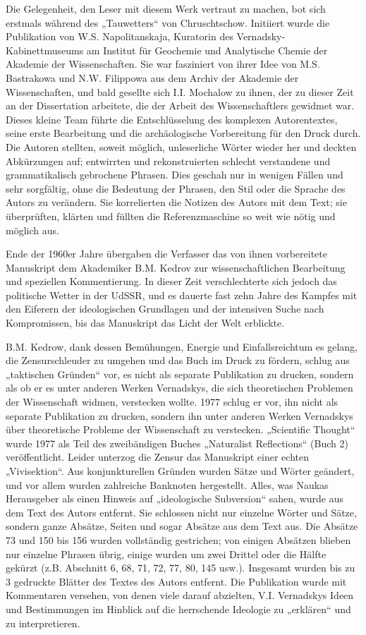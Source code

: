 \documentclass[11pt,a4paper]{article}
\begin{document}
Die Gelegenheit, den Leser mit diesem Werk vertraut zu machen, bot sich
erstmals während des „Tauwetters“ von Chruschtschow. Initiiert wurde die
Publikation von W.S. Napolitanskaja, Kuratorin des Vernadsky-Kabinettmuseums
am Institut für Geochemie und Analytische Chemie der Akademie der
Wissenschaften. Sie war fasziniert von ihrer Idee von M.S. Bastrakowa und
N.W. Filippowa aus dem Archiv der Akademie der Wissenschaften, und bald
gesellte sich I.I. Mochalow zu ihnen, der zu dieser Zeit an der Dissertation
arbeitete, die der Arbeit des Wissenschaftlers gewidmet war. Dieses kleine
Team führte die Entschlüsselung des komplexen Autorentextes, seine erste
Bearbeitung und die archäologische Vorbereitung für den Druck durch. Die
Autoren stellten, soweit möglich, unleserliche Wörter wieder her und deckten
Abkürzungen auf; entwirrten und rekonstruierten schlecht verstandene und
grammatikalisch gebrochene Phrasen. Dies geschah nur in wenigen Fällen und
sehr sorgfältig, ohne die Bedeutung der Phrasen, den Stil oder die Sprache des
Autors zu verändern. Sie korrelierten die Notizen des Autors mit dem Text; sie
überprüften, klärten und füllten die Referenzmaschine so weit wie nötig und
möglich aus.

Ende der 1960er Jahre übergaben die Verfasser das von ihnen vorbereitete
Manuskript dem Akademiker B.M. Kedrov zur wissenschaftlichen Bearbeitung und
speziellen Kommentierung. In dieser Zeit verschlechterte sich jedoch das
politische Wetter in der UdSSR, und es dauerte fast zehn Jahre des Kampfes mit
den Eiferern der ideologischen Grundlagen und der intensiven Suche nach
Kompromissen, bis das Manuskript das Licht der Welt erblickte.

B.M. Kedrow, dank dessen Bemühungen, Energie und Einfallsreichtum es gelang,
die Zensurschleuder zu umgehen und das Buch im Druck zu fördern, schlug aus
„taktischen Gründen“ vor, es nicht als separate Publikation zu drucken,
sondern als ob er es unter anderen Werken Vernadskys, die sich theoretischen
Problemen der Wissenschaft widmen, verstecken wollte. 1977 schlug er vor, ihn
nicht als separate Publikation zu drucken, sondern ihn unter anderen Werken
Vernadskys über theoretische Probleme der Wissenschaft zu verstecken.
„Scientific Thought“ wurde 1977 als Teil des zweibändigen Buches „Naturalist
Reflections“ (Buch 2) veröffentlicht. Leider unterzog die Zensur das
Manuskript einer echten „Vivisektion“. Aus konjunkturellen Gründen wurden
Sätze und Wörter geändert, und vor allem wurden zahlreiche Banknoten
hergestellt. Alles, was Naukas Herausgeber als einen Hinweis auf „ideologische
Subversion“ sahen, wurde aus dem Text des Autors entfernt. Sie schlossen nicht
nur einzelne Wörter und Sätze, sondern ganze Absätze, Seiten und sogar Absätze
aus dem Text aus. Die Absätze 73 und 150 bis 156 wurden vollständig
gestrichen; von einigen Absätzen blieben nur einzelne Phrasen übrig, einige
wurden um zwei Drittel oder die Hälfte gekürzt (z.B. Abschnitt 6, 68, 71, 72,
77, 80, 145 usw.). Insgesamt wurden bis zu 3 gedruckte Blätter des Textes des
Autors entfernt. Die Publikation wurde mit Kommentaren versehen, von denen
viele darauf abzielten, V.I. Vernadskys Ideen und Bestimmungen im Hinblick auf
die herrschende Ideologie zu „erklären“ und zu interpretieren.
\end{document}
